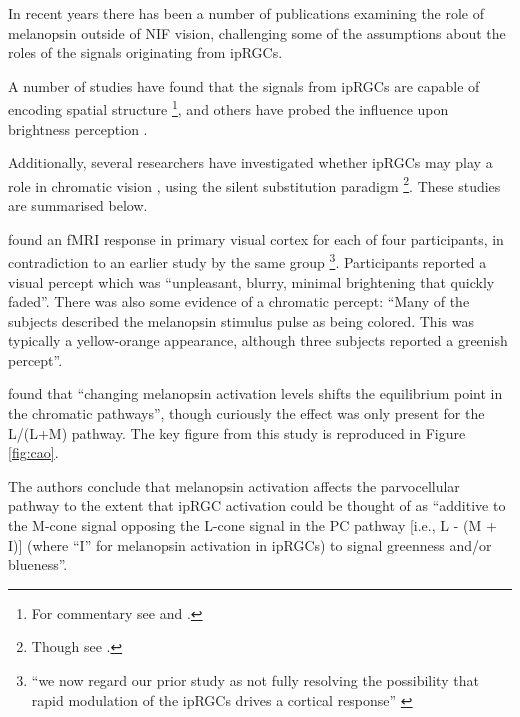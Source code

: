 In recent years there has been a number of publications examining the role of melanopsin outside of \gls{NIF} vision, challenging some of the assumptions about the roles of the signals originating from \glspl{ipRGC}.

A number of studies have found that the signals from ipRGCs are capable of encoding spatial structure \citep{ecker_melanopsin-expressing_2010, mouland_responses_2017, allen_melanopsin_2017, allen_form_2019, zhao_photoresponse_2014}\footnote{For commentary see \citet{spitschan_vision_2017} and \citet{sonoda_re-evaluating_2016}.}, and others have probed the influence upon brightness perception \citep{zele_cone_2018,brown_melanopsin-based_2012}.

Additionally, several researchers have investigated whether \glspl{ipRGC} may play a role in chromatic vision \citep{cao_evidence_2018, spitschan_human_2017-1,zele_melanopsin_2018,horiguchi_human_2013,vincent_adaptation_2019,vincent_adaptation_2019-1}, using the silent substitution paradigm \citep{estevez_silent_1982,spitschan_method_2018}\footnote{Though see \citet{kamar_silent-substitution_2019}.}. These studies are summarised below.

\textbf{\citet{spitschan_human_2017-1}} found an fMRI response in primary visual cortex for each of four participants, in contradiction to an earlier study by the same group \citep{spitschan_human_2016}\footnote{``we now regard our prior study as not fully resolving the possibility that rapid modulation of the ipRGCs drives a cortical response'' \citep{spitschan_human_2017-1}}. Participants reported a visual percept which was ``unpleasant, blurry, minimal brightening that quickly faded''. There was also some evidence of a chromatic percept: ``Many of the subjects described the melanopsin stimulus pulse as being colored. This was typically a yellow-orange appearance, although three subjects reported a greenish percept''.


\textbf{\citet{cao_evidence_2018}} found that ``changing melanopsin activation levels shifts the equilibrium point in the chromatic pathways'', though curiously the effect was only present for the L/(L+M) pathway. The key figure from this study is reproduced in Figure \ref{fig:cao}. 

The authors conclude that melanopsin activation affects the parvocellular pathway to the extent that \gls{ipRGC} activation could be thought of as ``additive to the M-cone signal opposing the L-cone signal in the PC pathway [i.e., L - (M + I)] (where ``I'' for melanopsin activation in ipRGCs) to signal greenness and/or blueness''. 

